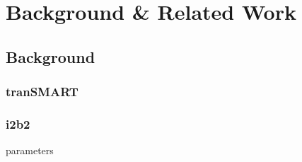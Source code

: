 \chapter{Background \& Related Work}

\section{Background}


\subsection{tranSMART}

\subsection{i2b2}
\label{sec:bg-i2b2}
parameters








